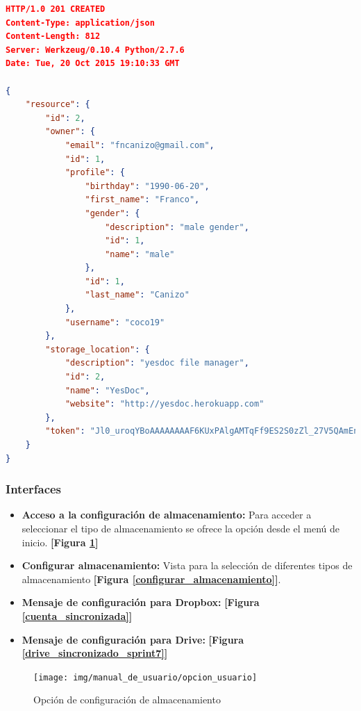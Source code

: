 \begin{lstlisting}[language=json]
HTTP/1.0 201 CREATED
Content-Type: application/json
Content-Length: 812
Server: Werkzeug/0.10.4 Python/2.7.6
Date: Tue, 20 Oct 2015 19:10:33 GMT

{
    "resource": {
        "id": 2, 
        "owner": {
            "email": "fncanizo@gmail.com", 
            "id": 1, 
            "profile": {
                "birthday": "1990-06-20", 
                "first_name": "Franco", 
                "gender": {
                    "description": "male gender", 
                    "id": 1, 
                    "name": "male"
                }, 
                "id": 1, 
                "last_name": "Canizo"
            }, 
            "username": "coco19"
        }, 
        "storage_location": {
            "description": "yesdoc file manager", 
            "id": 2, 
            "name": "YesDoc", 
            "website": "http://yesdoc.herokuapp.com"
        }, 
        "token": "Jl0_uroqYBoAAAAAAAAF6KUxPAlgAMTqFf9ES2S0zZl_27V5QAmEn5V58IUxcck1"
    }
}
\end{lstlisting}

\clearpage



\subsubsection{Interfaces}

\begin{itemize}
	\item \textbf{Acceso a la configuración de almacenamiento: } Para acceder a seleccionar el tipo de almacenamiento se ofrece la opción desde el menú de inicio. \textbf{[Figura \ref{opcion_usuario}]}
	\item \textbf{Configurar almacenamiento: } Vista para la selección de diferentes tipos de almacenamiento \textbf{[Figura \ref{configurar_almacenamiento}]}.
	\item \textbf{Mensaje de configuración para Dropbox: } \textbf{[Figura \ref{cuenta_sincronizada}]}
	\item \textbf{Mensaje de configuración para Drive: } \textbf{[Figura \ref{drive_sincronizado_sprint7}]}
\end{itemize}
    \begin{figure}
    	\centering
    	\texttt{[image: img/manual\_de\_usuario/opcion\_usuario]}
    	\caption{ Opción de configuración de almacenamiento}
    	\label{opcion_usuario}
    \end{figure}
    
